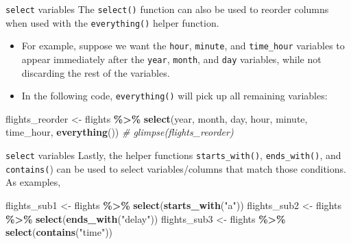 \documentclass[
  ignorenonframetext,
]{beamer}
\newenvironment{Shaded}{\begin{snugshade}}{\end{snugshade}}
\newcommand{\CommentTok}[1]{\textcolor[rgb]{0.56,0.35,0.01}{\textit{#1}}}
\newcommand{\FunctionTok}[1]{\textcolor[rgb]{0.13,0.29,0.53}{\textbf{#1}}}
\newcommand{\NormalTok}[1]{#1}
\newcommand{\OtherTok}[1]{\textcolor[rgb]{0.56,0.35,0.01}{#1}}
\newcommand{\SpecialCharTok}[1]{\textcolor[rgb]{0.81,0.36,0.00}{\textbf{#1}}}
\newcommand{\StringTok}[1]{\textcolor[rgb]{0.31,0.60,0.02}{#1}}
\begin{document}
\begin{frame}[fragile]{\texttt{select} variables}
\protect\hypertarget{select-variables-3}{}
The \texttt{select()} function can also be used to reorder columns when
used with the \texttt{everything()} helper function.

\begin{itemize}
\item
  For example, suppose we want the \texttt{hour}, \texttt{minute}, and
  \texttt{time\_hour} variables to appear immediately after the
  \texttt{year}, \texttt{month}, and \texttt{day} variables, while not
  discarding the rest of the variables.
\item
  In the following code, \texttt{everything()} will pick up all
  remaining variables:
\end{itemize}

\normalsize

\begin{Shaded}
\begin{Highlighting}[]
\NormalTok{flights\_reorder }\OtherTok{\textless{}{-}}\NormalTok{ flights }\SpecialCharTok{\%\textgreater{}\%} 
  \FunctionTok{select}\NormalTok{(year, month, day, hour, minute, time\_hour, }
         \FunctionTok{everything}\NormalTok{())}
\CommentTok{\# glimpse(flights\_reorder)}
\end{Highlighting}
\end{Shaded}

\normalsize
\end{frame}

\begin{frame}[fragile]{\texttt{select} variables}
\protect\hypertarget{select-variables-4}{}
Lastly, the helper functions \texttt{starts\_with()},
\texttt{ends\_with()}, and \texttt{contains(}) can be used to select
variables/columns that match those conditions. As examples,

\normalsize

\begin{Shaded}
\begin{Highlighting}[]
\NormalTok{flights\_sub1 }\OtherTok{\textless{}{-}}\NormalTok{ flights }\SpecialCharTok{\%\textgreater{}\%} \FunctionTok{select}\NormalTok{(}\FunctionTok{starts\_with}\NormalTok{(}\StringTok{"a"}\NormalTok{))}
\NormalTok{flights\_sub2 }\OtherTok{\textless{}{-}}\NormalTok{ flights }\SpecialCharTok{\%\textgreater{}\%} \FunctionTok{select}\NormalTok{(}\FunctionTok{ends\_with}\NormalTok{(}\StringTok{"delay"}\NormalTok{))}
\NormalTok{flights\_sub3 }\OtherTok{\textless{}{-}}\NormalTok{ flights }\SpecialCharTok{\%\textgreater{}\%} \FunctionTok{select}\NormalTok{(}\FunctionTok{contains}\NormalTok{(}\StringTok{"time"}\NormalTok{))}
\end{Highlighting}
\end{Shaded}

\normalsize
\end{frame}
\end{document}
